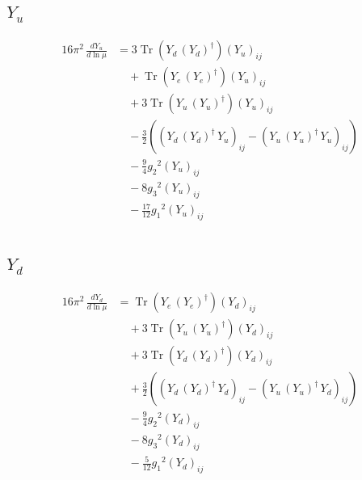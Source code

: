 \documentclass[10pt,a4paper]{article}
\begin{document}
\subsection*{$Y_u$}
\begin{align*}
16\pi^2\,\frac{d Y_u}{d\ln\mu} &=3 \operatorname{Tr}\!\left({Y_d}\,\left({Y_d}\right)^{\dagger}\right) \left({Y_u}\right)_{ij} \\
&\quad +\operatorname{Tr}\!\left({Y_e}\,\left({Y_e}\right)^{\dagger}\right) \left({Y_u}\right)_{ij} \\
&\quad +3 \operatorname{Tr}\!\left({Y_u}\,\left({Y_u}\right)^{\dagger}\right) \left({Y_u}\right)_{ij} \\
&\quad -\frac{3}{2} (\left({Y_d}\,\left({Y_d}\right)^{\dagger}\,{Y_u}\right)_{ij}-\left({Y_u}\,\left({Y_u}\right)^{\dagger}\,{Y_u}\right)_{ij}) \\
&\quad -\frac{9}{4} {g_2}^2 \left({Y_u}\right)_{ij} \\
&\quad -8 {g_3}^2 \left({Y_u}\right)_{ij} \\
&\quad -\frac{17}{12} {g_1}^2 \left({Y_u}\right)_{ij} \\
\end{align*}
\subsection*{$Y_d$}
\begin{align*}
16\pi^2\,\frac{d Y_d}{d\ln\mu} &=\operatorname{Tr}\!\left({Y_e}\,\left({Y_e}\right)^{\dagger}\right) \left({Y_d}\right)_{ij} \\
&\quad +3 \operatorname{Tr}\!\left({Y_u}\,\left({Y_u}\right)^{\dagger}\right) \left({Y_d}\right)_{ij} \\
&\quad +3 \operatorname{Tr}\!\left({Y_d}\,\left({Y_d}\right)^{\dagger}\right) \left({Y_d}\right)_{ij} \\
&\quad +\frac{3}{2} (\left({Y_d}\,\left({Y_d}\right)^{\dagger}\,{Y_d}\right)_{ij}-\left({Y_u}\,\left({Y_u}\right)^{\dagger}\,{Y_d}\right)_{ij}) \\
&\quad -\frac{9}{4} {g_2}^2 \left({Y_d}\right)_{ij} \\
&\quad -8 {g_3}^2 \left({Y_d}\right)_{ij} \\
&\quad -\frac{5}{12} {g_1}^2 \left({Y_d}\right)_{ij} \\
\end{align*}
\end{document}

